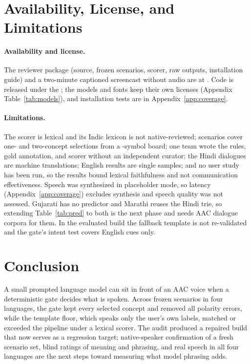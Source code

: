 \section{Availability, License, and Limitations}
\label{sec:limits}

\paragraph{Availability and license.}
The reviewer package (source, frozen scenarios, scorer, raw outputs, installation guide) and a two-minute captioned screencast without audio are at \demourl{}.
Code is released under the \codelicense{}; the models and fonts keep their own licenses (Appendix Table~\ref{tab:models}), and installation tests are in Appendix~\ref{app:coverage}.

\paragraph{Limitations.}
The scorer is lexical and its Indic lexicon is not native-reviewed; scenarios cover one- and two-concept selections from a \NSymbols{}-symbol board; one team wrote the rules, gold annotation, and scorer without an independent curator; the Hindi dialogues are machine translations; English results are single samples; and no user study has been run, so the results bound lexical faithfulness and not communication effectiveness.
Speech was synthesized in placeholder mode, so latency (Appendix~\ref{app:coverage}) excludes synthesis and speech quality was not assessed.
Gujarati has no predictor and Marathi reuses the Hindi trie, so extending Table~\ref{tab:pred} to both is the next phase and needs AAC dialogue corpora for them.
In the evaluated build the fallback template is not re-validated and the gate's intent test covers English cues only.

\section{Conclusion}
\label{sec:conclusion}

A small prompted language model can sit in front of an AAC voice when a deterministic gate decides what is spoken.
Across \NPrimAll{} frozen scenarios in four languages, the gate kept every selected concept and removed all polarity errors, while the template floor, which speaks only the user's own labels, matched or exceeded the pipeline under a lexical scorer.
The audit produced a repaired build that now serves as a regression target; native-speaker confirmation of a fresh scenario set, blind ratings of meaning and phrasing, and real speech in all four languages are the next steps toward measuring what model phrasing adds.
